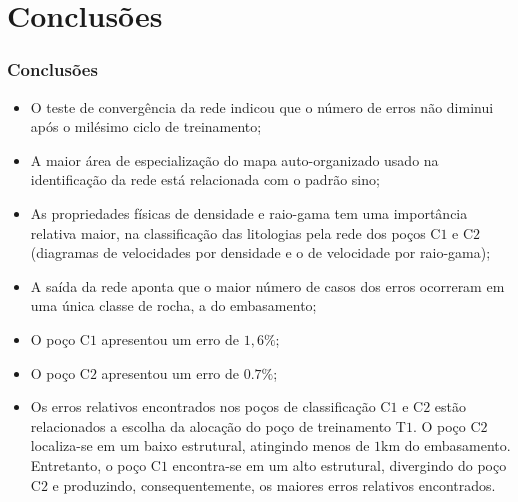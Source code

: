 \documentclass[10pt]{beamer} %
\begin{document}

\section{Conclusões}

\begin{frame}
	\frametitle{Conclusões}
\begin{small}
	

	\begin{itemize}
		\item O teste de convergência da rede indicou que o número de erros não diminui após o milésimo ciclo de treinamento;
		\pause
		\item A maior área de especialização do mapa auto-organizado usado na identificação da rede está relacionada com o padrão sino;
		\pause
		\item As propriedades físicas de densidade e raio-gama tem uma importância relativa maior, na classificação das litologias pela rede dos poços  C$1$ e C$2$ (diagramas de velocidades por densidade e o de velocidade por raio-gama);
		\pause
		\item A saída da rede aponta que o maior número de casos dos erros ocorreram em uma única classe de rocha, a do embasamento;
		\pause
		\item O poço C$1$ apresentou um erro de $1,6\%$;
		\pause
		\item O poço C$2$ apresentou um erro de $0.7\%$;
		\pause
		\item Os erros relativos encontrados nos poços de classificação C$1$ e C$2$ estão relacionados a escolha da alocação do poço de treinamento T$1$. O poço C$2$ localiza-se em um baixo estrutural, atingindo menos de $1$km do embasamento. Entretanto, o poço C$1$ encontra-se em um alto estrutural, divergindo do poço C$2$ e produzindo, consequentemente, os maiores erros relativos encontrados. 
	\end{itemize}
\end{small}	
\end{frame}




\end{document}
